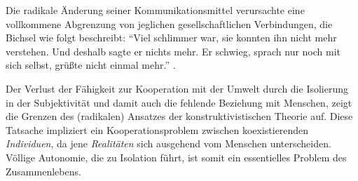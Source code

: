 Die radikale Änderung seiner Kommunikationsmittel verursachte eine vollkommene Abgrenzung von jeglichen gesellschaftlichen Verbindungen, die Bichsel wie folgt beschreibt:
``Viel schlimmer war, sie konnten ihn nicht mehr verstehen. Und deshalb sagte er nichts mehr. Er schwieg, sprach nur noch mit sich selbst, grüßte nicht einmal mehr.'' \parencite[vgl.][25]{bichsel-1990}.

Der Verlust der Fähigkeit zur Kooperation mit der Umwelt durch die Isolierung in der Subjektivität und damit auch die fehlende Beziehung mit Menschen, zeigt die Grenzen des (radikalen) Ansatzes der konstruktivistischen Theorie auf.
Diese Tatsache impliziert ein Kooperationsproblem zwischen koexistierenden \emph{Individuen}, da jene \emph{Realitäten} sich ausgehend vom Menschen unterscheiden.
Völlige Autonomie, die zu Isolation führt, ist somit ein essentielles Problem des Zusammenlebens.

